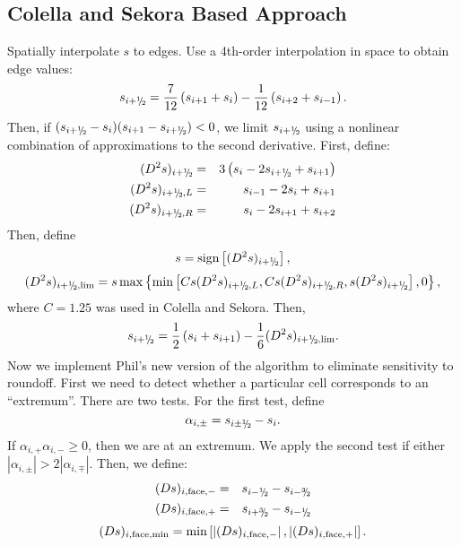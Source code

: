 \subsection{Colella and Sekora Based Approach}\label{Sec:ColellaSekora}
Spatially interpolate $s$ to edges.
Use a 4th-order interpolation in space to obtain edge values:
\begin{equation}
s_{i+\myhalf} = \frac{7}{12}\left(s_{i+1}+s_i\right) - \frac{1}{12}\left(s_{i+2}+s_{i-1}\right).
\end{equation}
Then, if $(s_{i+\myhalf}-s_i)(s_{i+1}-s_{i+\myhalf}) < 0$, we limit $s_{i+\myhalf}$ using
a nonlinear combination of approximations to the second derivative.
First, define:
\begin{eqnarray}
(D^2s)_{i+\myhalf} &=& 3\left(s_{i}-2s_{i+\myhalf}+s_{i+1}\right) \\
(D^2s)_{i+\myhalf,L} &=& s_{i-1}-2s_{i}+s_{i+1} \\
(D^2s)_{i+\myhalf,R} &=& s_{i}-2s_{i+1}+s_{i+2}
\end{eqnarray}
Then, define
\begin{equation}
s = \text{sign}\left[(D^2s)_{i+\myhalf}\right],
\end{equation}
\begin{equation}
(D^2s)_{i+\myhalf,\text{lim}} = s\max\left\{\min\left[Cs(D^2s)_{i+\myhalf,L},Cs(D^2s)_{i+\myhalf,R},s(D^2s)_{i+\myhalf}\right],0\right\},
\end{equation}
where $C=1.25$ was used in Colella and Sekora.  Then,
\begin{equation}
s_{i+\myhalf} = \frac{1}{2}\left(s_{i}+s_{i+1}\right) - \frac{1}{6}(D^2s)_{i+\myhalf,\text{lim}}.
\end{equation}
Now we implement Phil's new version of the algorithm to eliminate sensitivity to roundoff.
First we need to detect whether a particular cell corresponds to an ``extremum''.  There
are two tests.  For the first test, define
\begin{equation}
\alpha_{i,\pm} = s_{i\pm\myhalf} - s_i.
\end{equation}
If $\alpha_{i,+}\alpha_{i,-} \ge 0$, then we are at an extremum.  We apply the second
test if either $|\alpha_{i,\pm}| > 2|\alpha_{i,\mp}|$.  Then, we define:
\begin{eqnarray}
(Ds)_{i,{\rm face},-} &=& s_{i-\myhalf} - s_{i-\sfrac{3}{2}} \\
(Ds)_{i,{\rm face},+} &=& s_{i+\sfrac{3}{2}} - s_{i-\myhalf}
\end{eqnarray}
\begin{equation}
(Ds)_{i,{\rm face,min}} = \min\left[\left|(Ds)_{i,{\rm face},-}\right|,\left|(Ds)_{i,{\rm face},+}\right|\right].
\end{equation}
